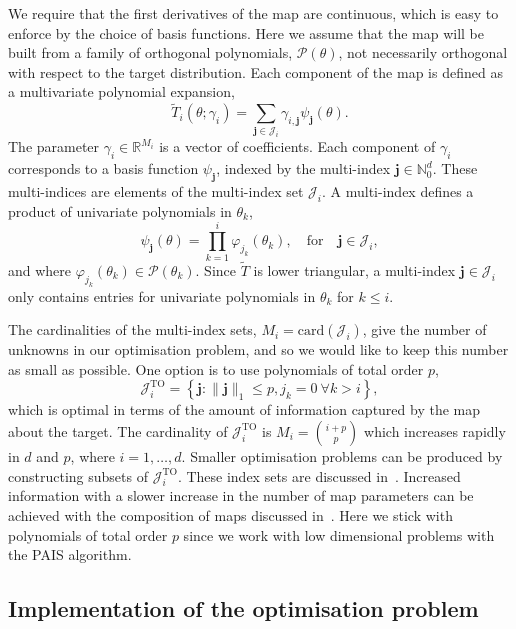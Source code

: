 \documentclass[final]{siamltex}
\begin{document}
We require that the first derivatives of the map are continuous, which is easy to enforce by the choice of basis functions. Here we assume that the map will be built from a family of orthogonal polynomials, $\mathcal{P}(\theta)$, not necessarily orthogonal with respect to the target distribution. Each component of the map is defined as a multivariate polynomial expansion,
\begin{equation}\label{eq:map_defn}
	\tilde{T}_i(\theta; \gamma_i) = \sum\limits_{\mathbf{j}\in\mathcal{J}_i} \!
\gamma_{i,\mathbf{j}}\psi_\mathbf{j}(\theta).
\end{equation}
The parameter $\gamma_i \in \mathbb{R}^{M_i}$ is a vector of coefficients. Each component of $\gamma_i$ corresponds to a basis function
$\psi_\mathbf{j}$, indexed by the multi-index $\mathbf{j} \in \mathbb{N}_0^d$. These multi-indices are elements of the multi-index set $\mathcal{J}_i$. A multi-index defines a product of univariate polynomials in $\theta_k$,
\[
	\psi_\mathbf{j}(\theta) = \prod\limits_{k=1}^i \! \varphi_{j_k}(\theta_k), \quad \text{for} \quad \mathbf{j} \in \mathcal{J}_i,
\]
and where $\varphi_{j_k}(\theta_k) \in \mathcal{P}(\theta_k)$. Since $\tilde{T}$ is lower triangular, a multi-index $\mathbf{j}\in\mathcal{J}_i$ only contains entries for univariate polynomials in $\theta_k$ for $k\leq i$.

The cardinalities of the multi-index sets, $M_i = \text{card}(\mathcal{J}_i)$, give the number of unknowns in our
optimisation problem, and so we would like to keep this number as small as possible. One option is
to use polynomials of total order $p$,
\[
	\mathcal{J}_i^\text{TO} = \left\{\mathbf{j}:\|\mathbf{j}\|_1 \leq p, j_k = 0\ \forall k > i\right\},
\]
which is optimal in terms of the amount of information captured by the map about the target. The cardinality of $\mathcal{J}_i^\text{TO}$ is $M_i = \binom{i+p}{p}$ which increases rapidly in $d$ and $p$, where $i = 1, \dots, d$. Smaller optimisation problems can be produced by constructing subsets of $\mathcal{J}_i^\text{TO}$. These index sets are discussed
in~\cite{parno2014transport}. Increased information with a slower increase in the number of map parameters can be achieved with the composition of maps discussed in~\cite{parno2015transport}. Here we stick with polynomials of total order $p$ since we work with low dimensional problems with the PAIS algorithm.


\subsection{Implementation of the optimisation problem}\label{sec:transport_implementation}
\end{document}
